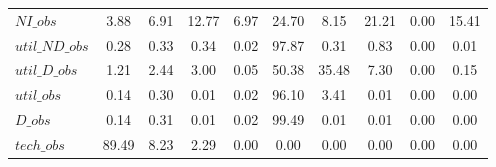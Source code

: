 \begin{center}
\begin{longtable}{lccccccccc}
$NI\_obs        $	 & 	         3.88	 & 	         6.91	 & 	        12.77	 & 	         6.97	 & 	        24.70	 & 	         8.15	 & 	        21.21	 & 	         0.00	 & 	        15.41 \\ 
$util\_ND\_obs  $	 & 	         0.28	 & 	         0.33	 & 	         0.34	 & 	         0.02	 & 	        97.87	 & 	         0.31	 & 	         0.83	 & 	         0.00	 & 	         0.01 \\ 
$util\_D\_obs   $	 & 	         1.21	 & 	         2.44	 & 	         3.00	 & 	         0.05	 & 	        50.38	 & 	        35.48	 & 	         7.30	 & 	         0.00	 & 	         0.15 \\ 
$util\_obs      $	 & 	         0.14	 & 	         0.30	 & 	         0.01	 & 	         0.02	 & 	        96.10	 & 	         3.41	 & 	         0.01	 & 	         0.00	 & 	         0.00 \\ 
$D\_obs         $	 & 	         0.14	 & 	         0.31	 & 	         0.01	 & 	         0.02	 & 	        99.49	 & 	         0.01	 & 	         0.01	 & 	         0.00	 & 	         0.00 \\ 
$tech\_obs      $	 & 	        89.49	 & 	         8.23	 & 	         2.29	 & 	         0.00	 & 	         0.00	 & 	         0.00	 & 	         0.00	 & 	         0.00	 & 	         0.00 \\ 
\end{longtable}
 \end{center}
